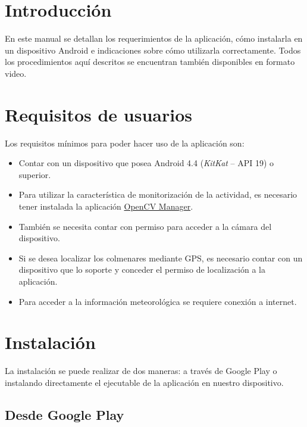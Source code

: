 
\section{Introducción}\label{introduccion-usuario}

En este manual se detallan los requerimientos de la aplicación, cómo
instalarla en un dispositivo Android e indicaciones sobre cómo
utilizarla correctamente. Todos los procedimientos aquí descritos se
encuentran también disponibles en formato video.

\section{Requisitos de usuarios}\label{requisitos-de-usuarios}

Los requisitos mínimos para poder hacer uso de la aplicación son:

\begin{itemize}
\tightlist
\item
  Contar con un dispositivo que posea Android 4.4 (\emph{KitKat} -- API
  19) o superior.
\item
  Para utilizar la característica de monitorización de la actividad, es
  necesario tener instalada la aplicación
  \href{https://play.google.com/store/apps/details?id=org.opencv.engine}{OpenCV
  Manager}.
\item
  También se necesita contar con permiso para acceder a la cámara del
  dispositivo.
\item
  Si se desea localizar los colmenares mediante GPS, es necesario contar
  con un dispositivo que lo soporte y conceder el permiso de
  localización a la aplicación.
\item
  Para acceder a la información meteorológica se requiere conexión a
  internet.
\end{itemize}

\section{Instalación}\label{instalacion}

La instalación se puede realizar de dos maneras: a través de Google Play
o instalando directamente el ejecutable de la aplicación en nuestro
dispositivo.

\subsection{Desde Google Play}\label{desde-google-play}

